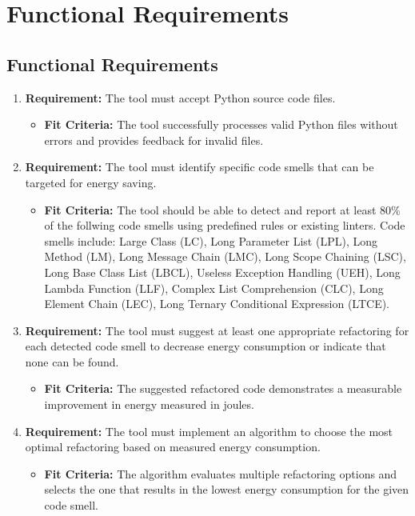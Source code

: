 \documentclass[12pt]{article}
\begin{document}
\section{Functional Requirements}
\subsection{Functional Requirements}

\begin{enumerate}
  \item \textbf{Requirement:} The tool must accept Python source code files.
  \begin{itemize}[label={}]
      \item \textbf{Fit Criteria:} The tool successfully processes valid Python files without errors and provides feedback for invalid files.
  \end{itemize}
  \item \textbf{Requirement:} The tool must identify specific code smells that can be targeted for energy saving.
  \begin{itemize}[label={}]
      \item \textbf{Fit Criteria:} The tool should be able to detect and report at least 80\% of the follwing code smells using predefined rules or existing linters. Code smells include: Large Class (LC), Long Parameter List (LPL), Long Method (LM), Long Message Chain (LMC), Long Scope Chaining (LSC), Long Base Class List (LBCL), Useless Exception Handling (UEH), Long Lambda Function (LLF), Complex List Comprehension (CLC), Long Element Chain (LEC), Long Ternary Conditional Expression (LTCE).
  \end{itemize}
  \item \textbf{Requirement:} The tool must suggest at least one appropriate refactoring for each detected code smell to decrease energy consumption or indicate that none can be found.
  \begin{itemize}[label={}]
      \item \textbf{Fit Criteria:} The suggested refactored code demonstrates a measurable improvement in energy measured in joules.
  \end{itemize}
  \item \textbf{Requirement:} The tool must implement an algorithm to choose the most optimal refactoring based on measured energy consumption.
  \begin{itemize}[label={}]
      \item \textbf{Fit Criteria:} The algorithm evaluates multiple refactoring options and selects the one that results in the lowest energy consumption for the given code smell.

\end{itemize}
\end{enumerate}
\end{document}
